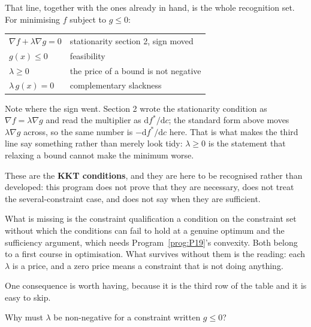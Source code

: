 \begin{fr}
That line, together with the ones already in hand, is the whole recognition
set. For minimising $f$ subject to $g \le 0$:

\begin{center}
\begin{tabular}{ll}
\toprule
$\nabla f + \lambda \nabla g = 0$ & stationarity \dash{} section 2, sign moved \\
$g(x) \le 0$ & feasibility \\
$\lambda \ge 0$ & the price of a bound is not negative \\
$\lambda\, g(x) = 0$ & complementary slackness \\
\bottomrule
\end{tabular}
\end{center}

Note where the sign went. Section 2 wrote the stationarity condition as
$\nabla f = \lambda \nabla g$ and read the multiplier as
$\mathrm{d}f^{*}/\mathrm{d}c$; the standard form above moves
$\lambda \nabla g$ across, so the same number is
$-\mathrm{d}f^{*}/\mathrm{d}c$ here. That is what makes the third line say
something rather than merely look tidy: $\lambda \ge 0$ is the statement that
relaxing a bound cannot make the minimum worse.

These are the \textbf{KKT conditions}, and they are here to be recognised
rather than developed: this program does not prove that they are necessary,
does not treat the several-constraint case, and does not say when they are
sufficient.

\begin{rigourbox}
What is missing is the constraint qualification \dash{} a condition on the
constraint set without which the conditions can fail to hold at a genuine
optimum \dash{} and the sufficiency argument, which needs
Program~\ref{prog:P19}'s convexity. Both belong to a first course in
optimisation. What survives without them is the reading: each $\lambda$ is a
price, and a zero price means a constraint that is not doing anything.
\end{rigourbox}
\end{fr}

\begin{fr}
One consequence is worth having, because it is the third row of the table and
it is easy to skip.

Why must $\lambda$ be non-negative for a constraint written $g \le 0$?
\nextframe
\end{fr}

